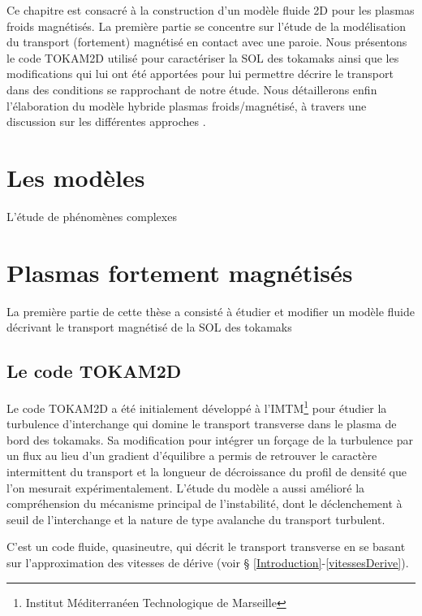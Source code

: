 Ce chapitre est consacré à la construction d'un modèle fluide 2D pour les
plasmas froids magnétisés.
La première partie se concentre sur l'étude de la modélisation du transport
(fortement) magnétisé en contact avec une paroie. Nous présentons le code TOKAM2D utilisé pour
caractériser la SOL des tokamaks ainsi que les modifications qui lui ont été
apportées pour lui permettre décrire le transport dans des conditions se
rapprochant de notre étude.
Nous détaillerons enfin l'élaboration du modèle hybride plasmas
froids/magnétisé, à travers une discussion sur les différentes approches .
\section{Les modèles}
L'étude de phénomènes complexes



\section{Plasmas fortement magnétisés}
La première partie de cette thèse a consisté à étudier et modifier un modèle
fluide décrivant le transport magnétisé de la SOL des tokamaks
\subsection{Le code TOKAM2D}
Le code TOKAM2D a été initialement développé à l'IMTM\footnote{Institut
Méditerranéen Technologique de Marseille} pour étudier la turbulence
d'interchange qui domine le transport transverse dans le plasma de bord des
tokamaks. Sa modification pour intégrer un forçage de la turbulence par un flux
au lieu d'un gradient d'équilibre a permis de retrouver le caractère
intermittent du transport et la longueur de décroissance du profil de densité
que l'on mesurait expérimentalement. L'étude du modèle a aussi amélioré la
compréhension du mécanisme principal de l'instabilité, dont le déclenchement à
seuil de l'interchange et la nature de type avalanche du transport turbulent.

C'est un code fluide, quasineutre, qui décrit le transport transverse en se
basant sur l'approximation des vitesses de dérive (voir §
\ref{Introduction}-\ref{vitessesDerive}).
